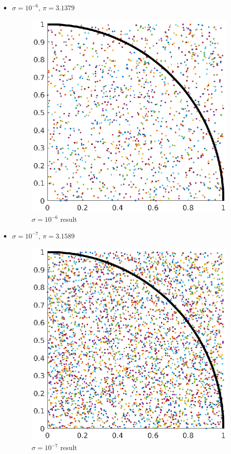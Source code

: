 \begin{itemize}
\begin{figure}[H]
   \end{figure}
    \item $\sigma = 10^{-6}$, $\pi = 3.1379$
    \begin{figure}[H] 
        \caption{$\sigma = 10^{-6}$ result} 
        \centering 
        \includegraphics[width=12cm]{../Figure/Bonus/mont1e-06.eps} 
   \end{figure}
    \item $\sigma = 10^{-7}$, $\pi = 3.1589$
    \begin{figure}[H] 
        \caption{$\sigma = 10^{-7}$ result} 
        \centering 
        \includegraphics[width=12cm]{../Figure/Bonus/mont1e-07.eps} 

\end{figure}
\end{itemize}
